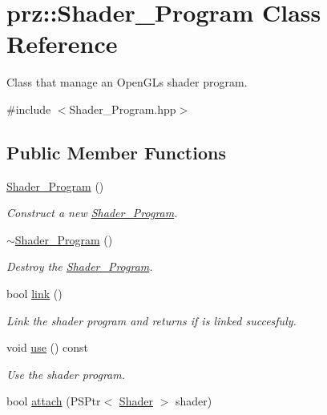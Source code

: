 \hypertarget{classprz_1_1_shader___program}{}\section{prz\+::Shader\+\_\+\+Program Class Reference}
\label{classprz_1_1_shader___program}


Class that manage an Open\+GL\textquotesingle{}s shader program.  




{\ttfamily \#include $<$Shader\+\_\+\+Program.\+hpp$>$}

\subsection*{Public Member Functions}
\begin{DoxyCompactItemize}
\item 
\mbox{\hyperlink{classprz_1_1_shader___program_a85eef4afd66769bb35c910b8933a233a}{Shader\+\_\+\+Program}} ()
\begin{DoxyCompactList}\small\item\em Construct a new \mbox{\hyperlink{classprz_1_1_shader___program}{Shader\+\_\+\+Program}}. \end{DoxyCompactList}\item 
\mbox{\hyperlink{classprz_1_1_shader___program_af7a5d1bcb0991735702b6410a5015e77}{$\sim$\+Shader\+\_\+\+Program}} ()
\begin{DoxyCompactList}\small\item\em Destroy the \mbox{\hyperlink{classprz_1_1_shader___program}{Shader\+\_\+\+Program}}. \end{DoxyCompactList}\item 
bool \mbox{\hyperlink{classprz_1_1_shader___program_a5a19bc3636c1b39cbf33739228dcfa34}{link}} ()
\begin{DoxyCompactList}\small\item\em Link the shader program and returns if is linked succesfuly. \end{DoxyCompactList}\item 
void \mbox{\hyperlink{classprz_1_1_shader___program_a7d77b91c272c02c6c4cf017c7d957305}{use}} () const
\begin{DoxyCompactList}\small\item\em Use the shader program. \end{DoxyCompactList}\item 
bool \mbox{\hyperlink{classprz_1_1_shader___program_abdd9abf63919d1c550bae23e0bdc76a5}{attach}} (P\+S\+Ptr$<$ \mbox{\hyperlink{classprz_1_1_shader}{Shader}} $>$ shader)

\end{DoxyCompactItemize}
